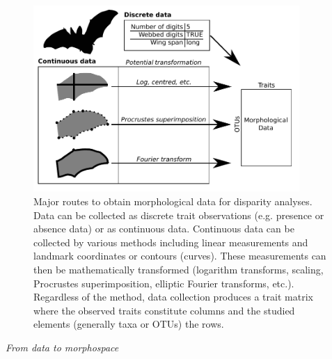 \documentclass[12pt,letterpaper]{article}
\renewcommand{\subsection}[1]{%
\bigskip
\begin{center}
\begin{large}
\normalfont\itshape #1
\end{large}
\end{center}}
\begin{document}
\begin{figure}[!htbp]
\centering
   \includegraphics[width=0.9\textwidth]{Figures/figure_data.pdf}
\caption{
    Major routes to obtain morphological data for disparity analyses. Data can be collected as discrete trait observations (e.g. presence or absence data) or as continuous data.
    Continuous data can be collected by various methods including linear measurements and landmark coordinates or contours (curves).
    These measurements can then be mathematically transformed (logarithm transforms, scaling, Procrustes superimposition, elliptic Fourier transforms, etc.).
    Regardless of the method, data collection produces a trait matrix where the observed traits constitute columns and the studied elements (generally taxa or OTUs) the rows.
}
\label{Fig:data}
\end{figure}


\subsection{From data to morphospace}
\label{section:morphospace}

\end{document}
